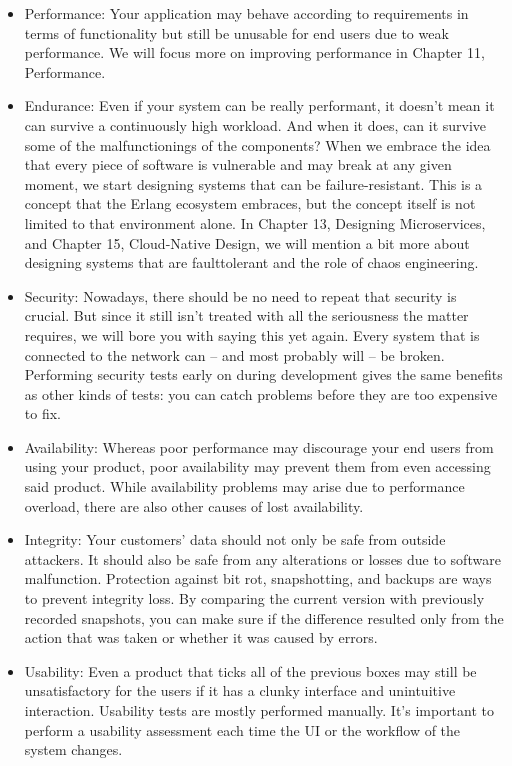 \begin{itemize}
\item 
Performance: Your application may behave according to requirements in terms of functionality but still be unusable for end users due to weak performance. We will focus more on improving performance in Chapter 11, Performance.

\item 
Endurance: Even if your system can be really performant, it doesn't mean it can survive a continuously high workload. And when it does, can it survive some of the malfunctionings of the components? When we embrace the idea that every piece of software is vulnerable and may break at any given moment, we start designing systems that can be failure-resistant. This is a concept that the Erlang ecosystem embraces, but the concept itself is not limited to that environment alone. In Chapter 13, Designing Microservices, and Chapter 15, Cloud-Native Design, we will mention a bit more about designing systems that are faulttolerant and the role of chaos engineering.

\item 
Security: Nowadays, there should be no need to repeat that security is crucial. But since it still isn't treated with all the seriousness the matter requires, we will bore you with saying this yet again. Every system that is connected to the network can – and most probably will – be broken. Performing security tests early on during development gives the same benefits as other kinds of tests: you can catch problems before they are too expensive to fix.

\item 
Availability: Whereas poor performance may discourage your end users from using your product, poor availability may prevent them from even accessing said product. While availability problems may arise due to performance overload, there are also other causes of lost availability.

\item 
Integrity: Your customers' data should not only be safe from outside attackers. It should also be safe from any alterations or losses due to software malfunction. Protection against bit rot, snapshotting, and backups are ways to prevent integrity loss. By comparing the current version with previously recorded snapshots, you can make sure if the difference resulted only from the action that was taken or whether it was caused by errors.

\item 
Usability: Even a product that ticks all of the previous boxes may still be unsatisfactory for the users if it has a clunky interface and unintuitive interaction. Usability tests are mostly performed manually. It's important to perform a usability assessment each time the UI or the workflow of the system changes.
\end{itemize}

